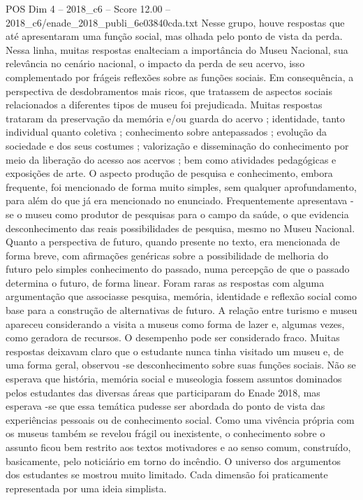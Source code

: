 \begin{textsample}{POS Dim 4 – 2018\_c6 – Score 12.00 – 2018\_c6/enade\_2018\_publi\_6e03840cda.txt}
Nesse grupo, houve respostas que até apresentaram uma função social, mas olhada pelo ponto de vista da perda.
Nessa linha, muitas respostas enalteciam a importância do Museu Nacional, sua relevância no cenário nacional, o impacto da perda de seu acervo, isso complementado por frágeis reflexões sobre as funções sociais.
Em consequência, a perspectiva de desdobramentos mais ricos, que tratassem de aspectos sociais relacionados a diferentes tipos de museu foi prejudicada.
Muitas respostas trataram da preservação da memória e/ou guarda do acervo ; identidade, tanto individual quanto coletiva ; conhecimento sobre antepassados ; evolução da sociedade e dos seus costumes ; valorização e disseminação do conhecimento por meio da liberação do acesso aos acervos ; bem como atividades pedagógicas e exposições de arte.
O aspecto produção de pesquisa e conhecimento, embora frequente, foi mencionado de forma muito simples, sem qualquer aprofundamento, para além do que já era mencionado no enunciado.
Frequentemente apresentava -se o museu como produtor de pesquisas para o campo da saúde, o que evidencia desconhecimento das reais possibilidades de pesquisa, mesmo no Museu Nacional.
Quanto a perspectiva de futuro, quando presente no texto, era mencionada de forma breve, com afirmações genéricas sobre a possibilidade de melhoria do futuro pelo simples conhecimento do passado, numa percepção de que o passado determina o futuro, de forma linear.
Foram raras as respostas com alguma argumentação que associasse pesquisa, memória, identidade e reflexão social como base para a construção de alternativas de futuro.
A relação entre turismo e museu apareceu considerando a visita a museus como forma de lazer e, algumas vezes, como geradora de recursos.
O desempenho pode ser considerado fraco.
Muitas respostas deixavam claro que o estudante nunca tinha visitado um museu e, de uma forma geral, observou -se desconhecimento sobre suas funções sociais.
Não se esperava que história, memória social e museologia fossem assuntos dominados pelos estudantes das diversas áreas que participaram do Enade 2018, mas esperava -se que essa temática pudesse ser abordada do ponto de vista das experiências pessoais ou de conhecimento social.
Como uma vivência própria com os museus também se revelou frágil ou inexistente, o conhecimento sobre o assunto ficou bem restrito aos textos motivadores e ao senso comum, construído, basicamente, pelo noticiário em torno do incêndio.
O universo dos argumentos dos estudantes se mostrou muito limitado.
Cada dimensão foi praticamente representada por uma ideia simplista.

\end{textsample}
